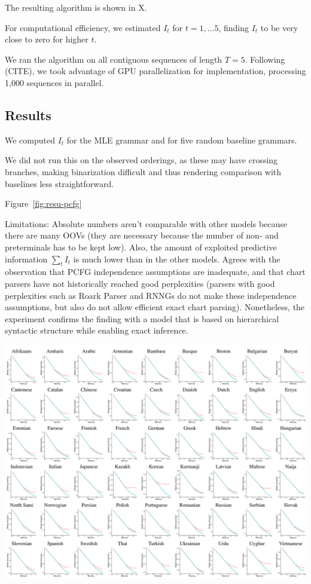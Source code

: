 \documentclass[11pt,letterpaper]{article}
\begin{document}
The resulting algorithm is shown in X.

For computational efficiency, we estimated $I_t$ for $t=1, \dots 5$, finding $I_t$ to be very close to zero for higher $t$.

We ran the algorithm on all contiguous sequences of length $T=5$.
Following (CITE), we took advantage of GPU parallelization for implementation, processing 1,000 sequences in parallel.


\subsection{Results}
We computed $I_t$ for the MLE grammar and for five random baseline grammars.

We did not run this on the observed orderings, as these may have crossing branches, making binarization difficult and thus rendering comparison with baselines less straightforward.

Figure~\ref{fig:resu-pcfg}

Limitations: Absolute numbers aren't comparable with other models because there are many OOVs (they are necessary because the number of non- and preterminals has to be kept low).
Also, the amount of exploited predictive information $\sum_t I_t$ is much lower than in the other models. Agrees with the observation that PCFG independence assumptions are inadequate, and that chart parsers have not historically reached good perplexities (parsers with good perplexities such as Roark Parser and RNNGs do not make these independence assumptions, but also do not allow efficient exact chart parsing).
Nonetheless, the experiment confirms the finding with a model that is based on hierarchical syntactic structure while enabling exact inference.

\begin{center}
\includegraphics[width=\textwidth]{results-table-pcfg.pdf}
\label{fig:resu-pcfg}
\end{center}
\end{document}
